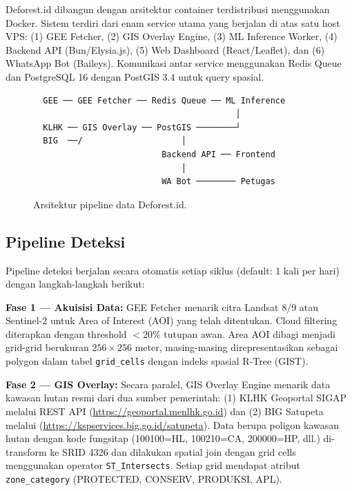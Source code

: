 \documentclass[10pt,conference,a4paper]{IEEEtran}
\begin{document}
Deforest.id dibangun dengan arsitektur container terdistribusi
menggunakan Docker. Sistem terdiri dari enam service utama yang
berjalan di atas satu host VPS: (1) GEE Fetcher, (2) GIS Overlay
Engine, (3) ML Inference Worker, (4) Backend API (Bun/Elysia.js),
(5) Web Dashboard (React/Leaflet), dan (6) WhatsApp Bot (Baileys).
Komunikasi antar service menggunakan Redis Queue dan PostgreSQL 16
dengan PostGIS 3.4 untuk query spasial.

\begin{figure}[H]
\centering
\small
\begin{verbatim}
  GEE ── GEE Fetcher ── Redis Queue ── ML Inference
                                         │
  KLHK ── GIS Overlay ── PostGIS ────────┘
  BIG  ──/                    │
                          Backend API ── Frontend
                              │              
                          WA Bot ──────── Petugas
\end{verbatim}
\caption{Arsitektur pipeline data Deforest.id.}
\label{fig:arch}
\end{figure}

\subsection{Pipeline Deteksi}

Pipeline deteksi berjalan secara otomatis setiap siklus (default: 1
kali per hari) dengan langkah-langkah berikut:

\vspace{4pt}
\noindent\textbf{Fase 1 --- Akuisisi Data:} GEE Fetcher menarik citra
Landsat 8/9 atau Sentinel-2 untuk Area of Interest (AOI) yang telah
ditentukan. Cloud filtering diterapkan dengan threshold $<20\%$ tutupan
awan. Area AOI dibagi menjadi grid-grid berukuran $256 \times 256$
meter, masing-masing direpresentasikan sebagai polygon dalam tabel
\texttt{grid\_cells} dengan indeks spasial R-Tree (GIST).
\vspace{4pt}

\noindent\textbf{Fase 2 --- GIS Overlay:} Secara paralel, GIS Overlay
Engine menarik data kawasan hutan resmi dari dua sumber pemerintah:
(1) KLHK Geoportal SIGAP melalui REST API
(\url{https://geoportal.menlhk.go.id}) dan (2) BIG Satupeta melalui
(\url{https://kspservices.big.go.id/satupeta}). Data berupa poligon
kawasan hutan dengan kode fungsitap (100100=HL, 100210=CA, 200000=HP,
dll.) di-transform ke SRID 4326 dan dilakukan spatial join dengan
grid cells menggunakan operator \texttt{ST\_Intersects}. Setiap grid
mendapat atribut \texttt{zone\_category} (PROTECTED, CONSERV,
PRODUKSI, APL).
\vspace{4pt}
\end{document}
